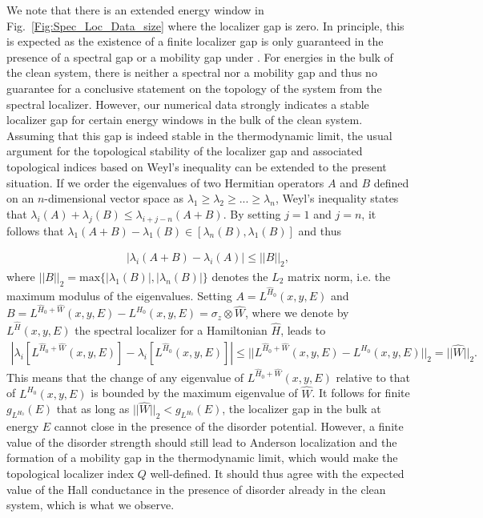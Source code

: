 \documentclass[aps,prb,amsmath,amssymb,twocolumn, superscriptaddress]{revtex4-2}
\begin{document}
We note that there is an extended energy window in Fig.~\ref{Fig:Spec_Loc_Data_size} where the localizer gap is zero. In principle, this is expected as the existence of a finite localizer gap is only guaranteed in the presence of a spectral gap \cite{Spec_loc_5_App} or a mobility gap under \cite{spec_loc_mobility_gap_App}. For energies in the bulk of the clean system, there is neither a spectral nor a mobility gap and thus no guarantee for a conclusive statement on the topology of the system from the spectral localizer. However, our numerical data strongly indicates a stable localizer gap for certain energy windows in the bulk of the clean system. Assuming that this gap is indeed stable in the thermodynamic limit, the usual argument for the topological stability of the localizer gap and associated topological indices based on Weyl's inequality \cite{Spec_loc_5_App, Fine_structure_App} can be extended to the present situation. If we order the eigenvalues of two Hermitian operators $A$ and $B$ defined on an $n$-dimensional vector space as $\lambda_1  \geq \lambda_2 \geq ... \geq \lambda_n$, Weyl's inequality states that $\lambda_i(A) + \lambda_j(B) \leq  \lambda_{i + j - n}(A + B)$. By setting $j=1$ and $j=n$, it follows that $\lambda_1(A + B) - \lambda_1(B) \in [\lambda_n(B), \lambda_1(B)]$ and thus 

\begin{align}
|\lambda_i(A + B) - \lambda_i(A)| \leq ||B||_2,
\end{align}
where $||B||_2 = \text{max}\{|\lambda_1(B)|, |\lambda_n(B)|\}$ denotes the $L_2$ matrix norm, i.e. the maximum modulus of the eigenvalues. Setting $A = L^{\hat H_0}(x,y,E)$ and $B = L^{\hat H_0 + \hat W}(x,y,E) - L^{H_0}(x,y,E) = \sigma_z \otimes \hat W$, where we denote by $L^{\hat H}(x,y,E)$ the spectral localizer for a Hamiltonian $\hat H$, leads to 
\begin{align}
\left |\lambda_i\left[L^{\hat H_0 + \hat W}(x,y,E)\right] - \lambda_i \left[L^{\hat H_0}(x,y,E)\right] \right| \leq ||L^{\hat H_0 + \hat W}(x,y,E) - L^{H_0}(x,y,E)||_2 = ||\hat W ||_2.
\end{align}
This means that the change of any eigenvalue of $L^{\hat H_0 + \hat W}(x,y,E)$ relative to that of $L^{H_0}(x,y,E)$ is bounded by the maximum eigenvalue of $\hat W$. It follows for finite $g_{L^{H_0}}(E)$ that as long as $||\hat W ||_2 < g_{L^{H_0}}(E)$, the localizer gap in the bulk at energy $E$ cannot close in the presence of the disorder potential. However, a finite value of the disorder strength should still lead to Anderson localization and the formation of a mobility gap in the thermodynamic limit, which would make the topological localizer index $Q$ well-defined. It should thus agree with the expected value of the Hall conductance in the presence of disorder already in the clean system, which is what we observe. 
\end{document}
